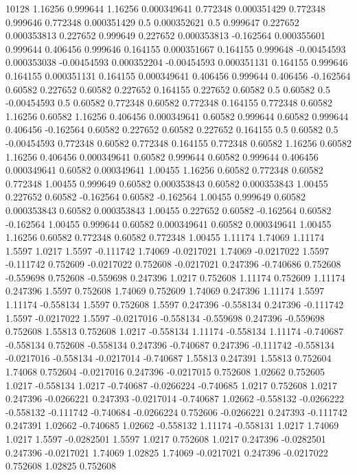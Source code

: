 10128
1.16256 0.999644
1.16256 0.000349641
0.772348 0.000351429
0.772348 0.999646
0.772348 0.000351429
0.5 0.000352621
0.5 0.999647
0.227652 0.000353813
0.227652 0.999649
0.227652 0.000353813
-0.162564 0.000355601
0.999644 0.406456
0.999646 0.164155
0.000351667 0.164155
0.999648 -0.00454593
0.000353038 -0.00454593
0.000352204 -0.00454593
0.000351131 0.164155
0.999646 0.164155
0.000351131 0.164155
0.000349641 0.406456
0.999644 0.406456
-0.162564 0.60582
0.227652 0.60582
0.227652 0.164155
0.227652 0.60582
0.5 0.60582
0.5 -0.00454593
0.5 0.60582
0.772348 0.60582
0.772348 0.164155
0.772348 0.60582
1.16256 0.60582
1.16256 0.406456
0.000349641 0.60582
0.999644 0.60582
0.999644 0.406456
-0.162564 0.60582
0.227652 0.60582
0.227652 0.164155
0.5 0.60582
0.5 -0.00454593
0.772348 0.60582
0.772348 0.164155
0.772348 0.60582
1.16256 0.60582
1.16256 0.406456
0.000349641 0.60582
0.999644 0.60582
0.999644 0.406456
0.000349641 0.60582
0.000349641 1.00455
1.16256 0.60582
0.772348 0.60582
0.772348 1.00455
0.999649 0.60582
0.000353843 0.60582
0.000353843 1.00455
0.227652 0.60582
-0.162564 0.60582
-0.162564 1.00455
0.999649 0.60582
0.000353843 0.60582
0.000353843 1.00455
0.227652 0.60582
-0.162564 0.60582
-0.162564 1.00455
0.999644 0.60582
0.000349641 0.60582
0.000349641 1.00455
1.16256 0.60582
0.772348 0.60582
0.772348 1.00455
1.11174 1.74069
1.11174 1.5597
1.0217 1.5597
-0.111742 1.74069
-0.0217021 1.74069
-0.0217022 1.5597
-0.111742 0.752609
-0.0217022 0.752608
-0.0217021 0.247396
-0.740686 0.752608
-0.559698 0.752608
-0.559698 0.247396
1.0217 0.752608
1.11174 0.752609
1.11174 0.247396
1.5597 0.752608
1.74069 0.752609
1.74069 0.247396
1.11174 1.5597
1.11174 -0.558134
1.5597 0.752608
1.5597 0.247396
-0.558134 0.247396
-0.111742 1.5597
-0.0217022 1.5597
-0.0217016 -0.558134
-0.559698 0.247396
-0.559698 0.752608
1.55813 0.752608
1.0217 -0.558134
1.11174 -0.558134
1.11174 -0.740687
-0.558134 0.752608
-0.558134 0.247396
-0.740687 0.247396
-0.111742 -0.558134
-0.0217016 -0.558134
-0.0217014 -0.740687
1.55813 0.247391
1.55813 0.752604
1.74068 0.752604
-0.0217016 0.247396
-0.0217015 0.752608
1.02662 0.752605
1.0217 -0.558134
1.0217 -0.740687
-0.0266224 -0.740685
1.0217 0.752608
1.0217 0.247396
-0.0266221 0.247393
-0.0217014 -0.740687
1.02662 -0.558132
-0.0266222 -0.558132
-0.111742 -0.740684
-0.0266224 0.752606
-0.0266221 0.247393
-0.111742 0.247391
1.02662 -0.740685
1.02662 -0.558132
1.11174 -0.558131
1.0217 1.74069
1.0217 1.5597
-0.0282501 1.5597
1.0217 0.752608
1.0217 0.247396
-0.0282501 0.247396
-0.0217021 1.74069
1.02825 1.74069
-0.0217021 0.247396
-0.0217022 0.752608
1.02825 0.752608

